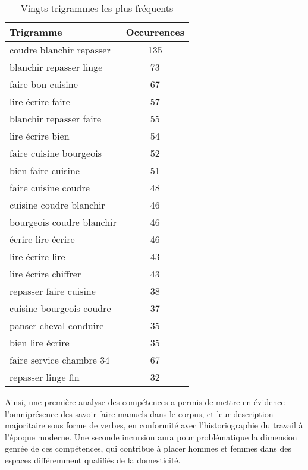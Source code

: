 \begin{table}[ht]
{\begin{tabular}{lc}
			\hline
			{\textbf{Trigramme}} & \textbf{Occurrences} \\ \hline
			coudre blanchir repasser               & 135                  \\
			blanchir repasser linge                & 73                   \\
			faire bon cuisine                      & 67                   \\
			lire écrire faire                      & 57                   \\
			blanchir repasser faire                & 55                   \\
			lire écrire bien                       & 54                   \\
			faire cuisine bourgeois                & 52                   \\
			bien faire cuisine                     & 51                   \\
			faire cuisine coudre                   & 48                   \\
			cuisine coudre blanchir                & 46                   \\
			bourgeois coudre blanchir              & 46                   \\
			écrire lire écrire                     & 46                   \\
			lire écrire lire                       & 43                   \\
			lire écrire chiffrer                   & 43                   \\
			repasser faire cuisine                 & 38                   \\
			cuisine bourgeois coudre               & 37                   \\
			panser cheval conduire                 & 35                   \\
			bien lire écrire                       & 35                   \\
			faire service chambre 34               & 67                   \\
			repasser linge fin                     & 32                   \\
			\hline
		\end{tabular}
		\caption{Vingts trigrammes les plus fréquents}
	}
\end{table}

\bigskip


Ainsi, une première analyse des compétences a permis de mettre en évidence l'omniprésence des savoir-faire manuels dans le corpus, et leur description majoritaire sous forme de verbes, en conformité avec l'historiographie du travail à l'époque moderne. Une seconde incursion aura pour problématique la dimension genrée de ces compétences, qui contribue à placer hommes et femmes dans des espaces différemment qualifiés de la domesticité. 

